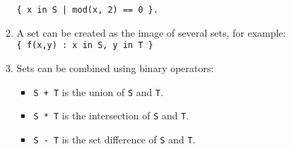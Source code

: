 \begin{enumerate}[(a)]
\begin{enumerate}[1.]
            \hspace*{1.3cm}
            \texttt{\{ x in S | mod(x, 2) == 0 \}.}
      \item A set can be created as the image of several sets, for example:
            \\[0.2cm]
            \hspace*{1.3cm}
            \texttt{\{ f(x,y) : x in S, y in T \}}
      \item Sets can be combined using binary operators:
            \begin{itemize}
            \item \texttt{S + T} is the union of \texttt{S} and \texttt{T}.
            \item \texttt{S * T} is the intersection of \texttt{S} and \texttt{T}.
            \item \texttt{S - T} is the set difference of \texttt{S} and \texttt{T}.
                  \eox
            \end{itemize}
      \end{enumerate}
\end{enumerate}

